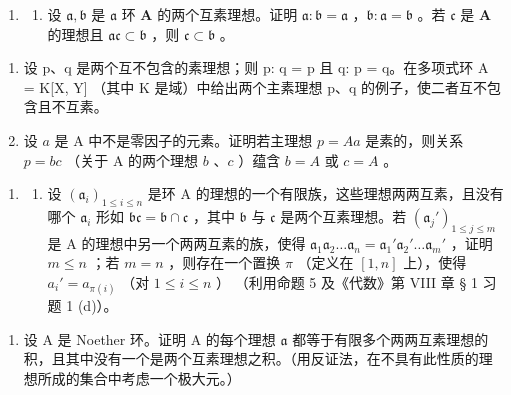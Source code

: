 \begin{enumerate}
\def\labelenumi{\arabic{enumi}.}
\setcounter{enumi}{7}
\tightlist
\item
  \begin{enumerate}
  \def\labelenumii{(\alph{enumii})}
  \tightlist
  \item
    设 \(\mathfrak{a}, \mathfrak{b}\) 是 \(\mathfrak{a}\) 环 \(\mathbf{A}\) 的两个互素理想。证明 \(\mathfrak{a}: \mathfrak{b} = \mathfrak{a}\) ，\(\mathfrak{b}: \mathfrak{a} = \mathfrak{b}\) 。若 \(\mathfrak{c}\) 是 \(\mathbf{A}\) 的理想且 \(\mathfrak{ac} \subset \mathfrak{b}\) ，则 \(\mathfrak{c} \subset \mathfrak{b}\) 。
  \end{enumerate}
\end{enumerate}

\begin{enumerate}
\def\labelenumi{(\alph{enumi})}
\setcounter{enumi}{1}
\item
  设 p、q 是两个互不包含的素理想；则 p: q = p 且 q: p = q。在多项式环 A = K{[}X, Y{]} （其中 K 是域）中给出两个主素理想 p、q 的例子，使二者互不包含且不互素。
\item
  设 \(a\) 是 A 中不是零因子的元素。证明若主理想 \(p = Aa\) 是素的，则关系 \(p = bc\) （关于 A 的两个理想 \(b\) 、\(c\) ）蕴含 \(b = A\) 或 \(c = A\) 。
\end{enumerate}

\begin{enumerate}
\def\labelenumi{\arabic{enumi}.}
\setcounter{enumi}{8}
\tightlist
\item
  \begin{enumerate}
  \def\labelenumii{(\alph{enumii})}
  \tightlist
  \item
    设 \((\mathfrak{a}_i)_{1 \leqslant i \leqslant n}\) 是环 A 的理想的一个有限族，这些理想两两互素，且没有哪个 \(\mathfrak{a}_i\) 形如 \(\mathfrak{bc} = \mathfrak{b} \cap \mathfrak{c}\) ，其中 \(\mathfrak{b}\) 与 \(\mathfrak{c}\) 是两个互素理想。若 \((\mathfrak{a}_j')_{1 \leqslant j \leqslant m}\) 是 A 的理想中另一个两两互素的族，使得 \(\mathfrak{a}_1\mathfrak{a}_2 \ldots \mathfrak{a}_n = \mathfrak{a}_1'\mathfrak{a}_2' \ldots \mathfrak{a}_m'\) ，证明 \(m \leqslant n\) ；若 \(m = n\) ，则存在一个置换 \(\pi\) （定义在 \([1, n]\) 上），使得 \(a_i' = a_{\pi(i)}\) （对 \(1 \leqslant i \leqslant n\) ） （利用命题 5 及《代数》第 VIII 章 § 1 习题 1 (d)）。
  \end{enumerate}
\end{enumerate}

\begin{enumerate}
\def\labelenumi{(\alph{enumi})}
\setcounter{enumi}{1}
\tightlist
\item
  设 A 是 Noether 环。证明 A 的每个理想 \(\mathfrak{a}\) 都等于有限多个两两互素理想的积，且其中没有一个是两个互素理想之积。（用反证法，在不具有此性质的理想所成的集合中考虑一个极大元。）
\end{enumerate}

